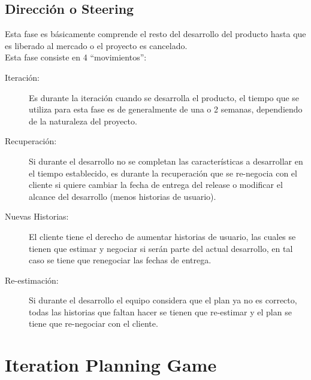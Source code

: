 
    \subsection{Dirección o Steering}
    \label{sub:steering}

    Esta fase es básicamente comprende el resto del desarrollo del producto hasta que es liberado al mercado o el proyecto es cancelado.\\

    Esta fase consiste en 4 ``movimientos'':

    \begin{description}
      \item[Iteración:] Es durante la iteración cuando se desarrolla el producto, el tiempo que se utiliza para esta fase es de generalmente de una o 2 semanas, dependiendo de la naturaleza del proyecto.

      \item[Recuperación:] Si durante el desarrollo no se completan las características a desarrollar en el tiempo establecido, es durante la recuperación que se re-negocia con el cliente si quiere cambiar la fecha de entrega del release o modificar el alcance del desarrollo (menos historias de usuario).

      \item[Nuevas Historias:] El cliente tiene el derecho de aumentar historias de usuario, las cuales se tienen que estimar y negociar si serán parte del actual desarrollo, en tal caso se tiene que renegociar las fechas de entrega.

      \item[Re-estimación:] Si durante el desarrollo el equipo considera que el plan ya no es correcto, todas las historias que faltan hacer se tienen que re-estimar y el plan se tiene que re-negociar con el cliente.
    \end{description}


    \section{Iteration Planning Game}
    \label{sec:iteracion}


